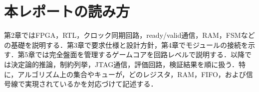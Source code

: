 \section{本レポートの読み方}
第2章ではFPGA，RTL，クロック同期回路，ready/valid通信，RAM，FSMなどの基礎を説明する．第3章で要求仕様と設計方針，第4章でモジュールの接続を示す．第5章では完全盤面を管理するゲームコアを回路レベルで説明する．以降では決定論的推論，制約列挙，JTAG通信，評価回路，検証結果を順に扱う．特に，アルゴリズム上の集合やキューが，どのレジスタ，RAM，FIFO，および信号線で実現されているかを対応づけて記述する．
